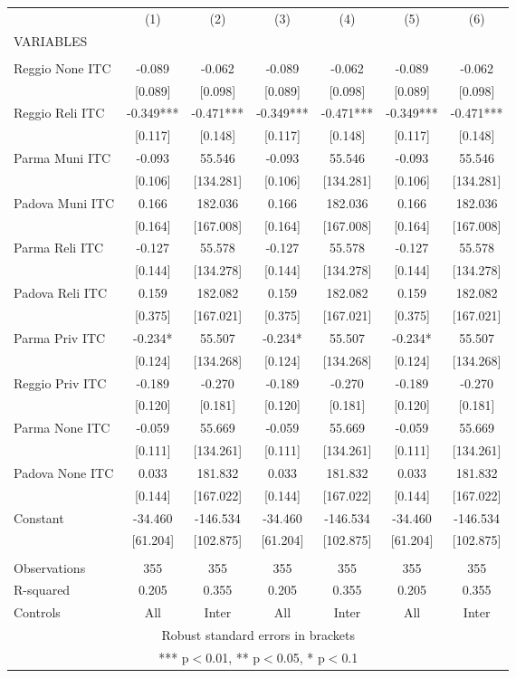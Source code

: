 \begin{tabular}{lcccccc} \hline
 & (1) & (2) & (3) & (4) & (5) & (6) \\
VARIABLES &  &  &  &  &  &  \\ \hline
 &  &  &  &  &  &  \\
Reggio None ITC & -0.089 & -0.062 & -0.089 & -0.062 & -0.089 & -0.062 \\
 & [0.089] & [0.098] & [0.089] & [0.098] & [0.089] & [0.098] \\
Reggio Reli ITC & -0.349*** & -0.471*** & -0.349*** & -0.471*** & -0.349*** & -0.471*** \\
 & [0.117] & [0.148] & [0.117] & [0.148] & [0.117] & [0.148] \\
Parma Muni ITC & -0.093 & 55.546 & -0.093 & 55.546 & -0.093 & 55.546 \\
 & [0.106] & [134.281] & [0.106] & [134.281] & [0.106] & [134.281] \\
Padova Muni ITC & 0.166 & 182.036 & 0.166 & 182.036 & 0.166 & 182.036 \\
 & [0.164] & [167.008] & [0.164] & [167.008] & [0.164] & [167.008] \\
Parma Reli ITC & -0.127 & 55.578 & -0.127 & 55.578 & -0.127 & 55.578 \\
 & [0.144] & [134.278] & [0.144] & [134.278] & [0.144] & [134.278] \\
Padova Reli ITC & 0.159 & 182.082 & 0.159 & 182.082 & 0.159 & 182.082 \\
 & [0.375] & [167.021] & [0.375] & [167.021] & [0.375] & [167.021] \\
Parma Priv ITC & -0.234* & 55.507 & -0.234* & 55.507 & -0.234* & 55.507 \\
 & [0.124] & [134.268] & [0.124] & [134.268] & [0.124] & [134.268] \\
Reggio Priv ITC & -0.189 & -0.270 & -0.189 & -0.270 & -0.189 & -0.270 \\
 & [0.120] & [0.181] & [0.120] & [0.181] & [0.120] & [0.181] \\
Parma None ITC & -0.059 & 55.669 & -0.059 & 55.669 & -0.059 & 55.669 \\
 & [0.111] & [134.261] & [0.111] & [134.261] & [0.111] & [134.261] \\
Padova None ITC & 0.033 & 181.832 & 0.033 & 181.832 & 0.033 & 181.832 \\
 & [0.144] & [167.022] & [0.144] & [167.022] & [0.144] & [167.022] \\
Constant & -34.460 & -146.534 & -34.460 & -146.534 & -34.460 & -146.534 \\
 & [61.204] & [102.875] & [61.204] & [102.875] & [61.204] & [102.875] \\
 &  &  &  &  &  &  \\
Observations & 355 & 355 & 355 & 355 & 355 & 355 \\
R-squared & 0.205 & 0.355 & 0.205 & 0.355 & 0.205 & 0.355 \\
 Controls & All & Inter & All & Inter & All & Inter \\ \hline
\multicolumn{7}{c}{ Robust standard errors in brackets} \\
\multicolumn{7}{c}{ *** p$<$0.01, ** p$<$0.05, * p$<$0.1} \\
\end{tabular}
